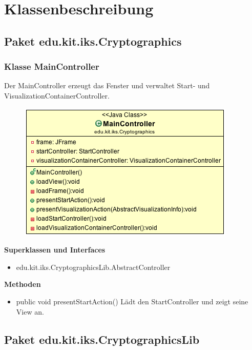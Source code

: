 \documentclass{article}
\begin{document}
\section{Klassenbeschreibung}
  \subsection{Paket edu.kit.iks.Cryptographics}
    \subsubsection{Klasse MainController}
      Der MainController erzeugt das Fenster und verwaltet Start- und VisualizationContainerController.
      \begin{figure}[H]
        \centering
        \includegraphics[width=\textwidth]{resources/edu-kit-iks-Cryptographics-MainController}
      \end{figure}

      \textbf{Superklassen und Interfaces}
      \begin{itemize}
        \item edu.kit.iks.CryptographicsLib.AbstractController
      \end{itemize}
      
      \textbf{Methoden}
      \begin{itemize}
        \item public void presentStartAction() \newline
        Lädt den StartController und zeigt seine View an.
      \end{itemize}

  \subsection{Paket edu.kit.iks.CryptographicsLib}
\end{document}
